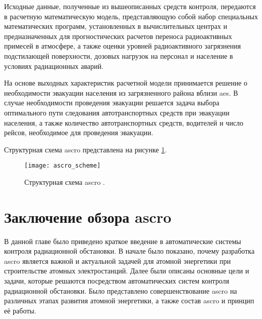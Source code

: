 Исходные данные, полученные из вышеописанных средств контроля, передаются в расчетную математическую модель,  
представляющую собой набор специальных математических программ, установленных в вычислительных центрах и предназначенных 
для прогностических расчетов переноса радиоактивных примесей в атмосфере, а также оценки уровней радиоактивного 
загрязнения подстилающей поверхности, дозовых нагрузок на персонал и население в условиях радиационных аварий.

На основе выходных характеристик расчетной модели принимается решение о необходимости эвакуации населения из 
загрязненного района вблизи \ac{aes}. В случае необходимости проведения эвакуации решается задача выбора оптимального 
пути следования автотранспортных средств при эвакуации населения, а также количество автотранспортных средств, водителей 
и число рейсов, необходимое для проведения эвакуации.

Структурная схема \ac{ascro} представлена на рисунке \ref{fig_ascro_scheme}.

\begin{figure}[ht!]
	\centering
	\texttt{[image: ascro\_scheme]}
	\captionsetup{justification=centering}
    \caption{Структурная схема \ac{ascro} \cite{elokhin}.}
    \label{fig_ascro_scheme}
\end{figure}

\section{Заключение обзора \ac{ascro}}

В данной главе было приведено краткое введение в автоматические системы контроля радиационной обстановки. В начале 
было показано, почему разработка \ac{ascro} является важной и актуальной задачей для атомной энергетики при 
строительстве атомных электростанций. Далее были описаны основные цели и задачи, которые решаются посредством 
автоматических систем контроля радиационной обстановки. Было представлено совершенствование \ac{ascro} на различных 
этапах развития атомной энергетики, а также состав \ac{ascro} и принцип её работы.